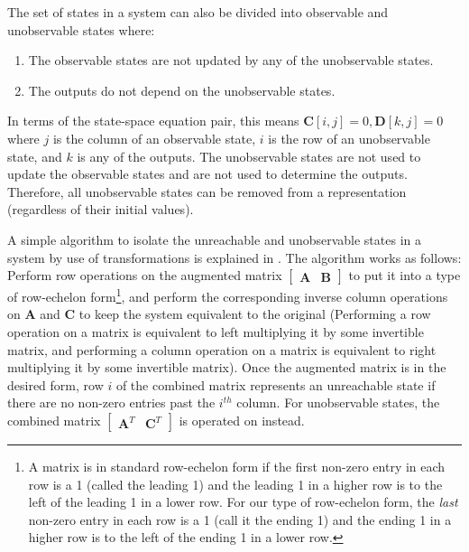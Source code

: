     The set of states in a system can also be divided into
observable and unobservable states where:
\begin{enumerate}
\item The observable states are not updated by any of the
unobservable states.

\item The outputs do not depend on the unobservable states.
\end{enumerate}

    In terms of the state-space equation pair, this means $\mathbf{C}[i,j] =
0, \mathbf{D}[k,j] = 0$ where $j$ is the column of an observable
state, $i$ is the row of an unobservable state, and $k$ is any of
the outputs.
    The unobservable states are not used to update the observable
states and are not used to determine the outputs. Therefore, all
unobservable states can be removed from a representation
(regardless of their initial values).

    A simple algorithm to isolate the unreachable and unobservable
states in a system by use of transformations is explained in
\cite{Mayne}. The algorithm works as follows: Perform row
operations on the augmented matrix $\left [ \begin{array} {cc}
\mathbf{A} & \mathbf{B} \end{array} \right ]$ to put it into a
type of row-echelon form\footnote{A matrix is in standard
row-echelon form if the first non-zero entry in each row is a 1
(called the leading 1) and the leading 1 in a higher row is to the
left of the leading 1 in a lower row. For our type of row-echelon
form, the \emph{last} non-zero entry in each row is a 1 (call it
the ending 1) and the ending 1 in a higher row is to the left of
the ending 1 in a lower row.}, and perform the corresponding
inverse column operations on $\mathbf{A}$ and $\mathbf{C}$ to keep
the system equivalent to the original (Performing a row operation
on a matrix is equivalent to left multiplying it by some
invertible matrix, and performing a column operation on a matrix
is equivalent to right multiplying it by some invertible matrix).
Once the augmented matrix is in the desired form, row $i$ of the
combined matrix represents an unreachable state if there are no
non-zero entries past the $i^{th}$ column. For unobservable
states, the combined matrix $\left [ \begin{array} {cc}
\mathbf{A}^T & \mathbf{C}^T
\end{array} \right ]$ is operated on instead.

